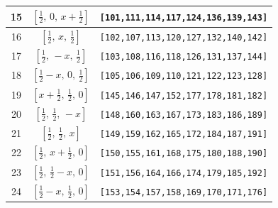 \documentclass[fleqn,8pt]{jsarticle}
\begin{document}
\begin{longtable}{ccc}
15 & $\left[ \frac{1}{2},\, 0,\, x + \frac{1}{2} \right]$ & {\tt [101,111,114,117,124,136,139,143]} \\ \hline
16 & $\left[ \frac{1}{2},\, x,\, \frac{1}{2} \right]$ & {\tt [102,107,113,120,127,132,140,142]} \\ \hline
17 & $\left[ \frac{1}{2},\, - x,\, \frac{1}{2} \right]$ & {\tt [103,108,116,118,126,131,137,144]} \\ \hline
18 & $\left[ \frac{1}{2} - x,\, 0,\, \frac{1}{2} \right]$ & {\tt [105,106,109,110,121,122,123,128]} \\ \hline
19 & $\left[ x + \frac{1}{2},\, \frac{1}{2},\, 0 \right]$ & {\tt [145,146,147,152,177,178,181,182]} \\ \hline
20 & $\left[ \frac{1}{2},\, \frac{1}{2},\, - x \right]$ & {\tt [148,160,163,167,173,183,186,189]} \\ \hline
21 & $\left[ \frac{1}{2},\, \frac{1}{2},\, x \right]$ & {\tt [149,159,162,165,172,184,187,191]} \\ \hline
22 & $\left[ \frac{1}{2},\, x + \frac{1}{2},\, 0 \right]$ & {\tt [150,155,161,168,175,180,188,190]} \\ \hline
23 & $\left[ \frac{1}{2},\, \frac{1}{2} - x,\, 0 \right]$ & {\tt [151,156,164,166,174,179,185,192]} \\ \hline
24 & $\left[ \frac{1}{2} - x,\, \frac{1}{2},\, 0 \right]$ & {\tt [153,154,157,158,169,170,171,176]} \\
\end{longtable}
\renewcommand{\arraystretch}{1.2}
\end{document}
